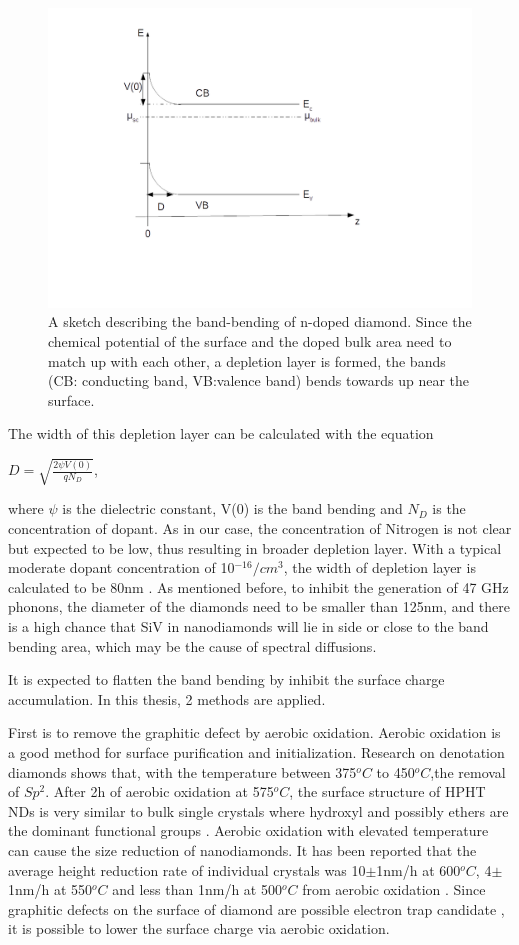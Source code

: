 \begin{figure}[h]
\centering
\includegraphics[width=0.7\linewidth]{Figures/pic/bandbending}
\caption{A sketch describing the band-bending of n-doped diamond. Since the chemical potential of the surface and the doped bulk area need to match up with each other, a depletion layer is formed, the bands (CB: conducting band, VB:valence band) bends towards up near the surface.  }
\label{fig:bandbending}
\end{figure}

The width of this depletion layer can be calculated with the equation

$D = \sqrt{\frac{2\psi V(0)}{qN_{D}}}$, 

where $\psi$ is the dielectric constant, V(0) is the band bending and $N_{D}$ is the concentration of dopant. As in our case, the concentration of Nitrogen is not clear but expected to be low, thus resulting in broader depletion layer. With a typical moderate dopant concentration of 10$^{-16}/cm^{3}$, the width of depletion layer is calculated to be 80nm \citep{diederich_electron_1998}. As mentioned before, to inhibit the generation of 47 GHz phonons, the diameter of the diamonds need to be smaller than 125nm, and there is a high chance that SiV in nanodiamonds will lie in side or close to the band bending area, which may be the cause of spectral diffusions.

It is expected to flatten the band bending by inhibit the surface charge accumulation. In this thesis, 2 methods are applied. 

First is to remove the graphitic defect by aerobic oxidation. Aerobic oxidation is a good method for surface purification and initialization. Research on denotation diamonds shows that, with the temperature between 375$^{o}C$ to 450$^{o}C$,the removal of $Sp^{2}$\citep{osswald_control_2006}. After 2h of aerobic oxidation at 575$^{o}C$, the surface structure of HPHT NDs is very similar to bulk single crystals where hydroxyl and possibly ethers are the dominant functional groups \citep{wolcott_surface_2014}. Aerobic oxidation with elevated temperature can cause the size reduction of nanodiamonds. It has been reported that the average height reduction rate of individual crystals was 10$\pm$1nm/h at 600$^{o}C$, 4$\pm$1nm/h at 550$^{o}C$ and less than 1nm/h at 500$^{o}C$ from aerobic oxidation \citep{t._gaebel_size-reduction_2012}. Since graphitic defects on the surface of diamond are possible electron trap candidate \citep{ristein_electronic_2000}, it is possible to lower the surface charge via aerobic oxidation.

